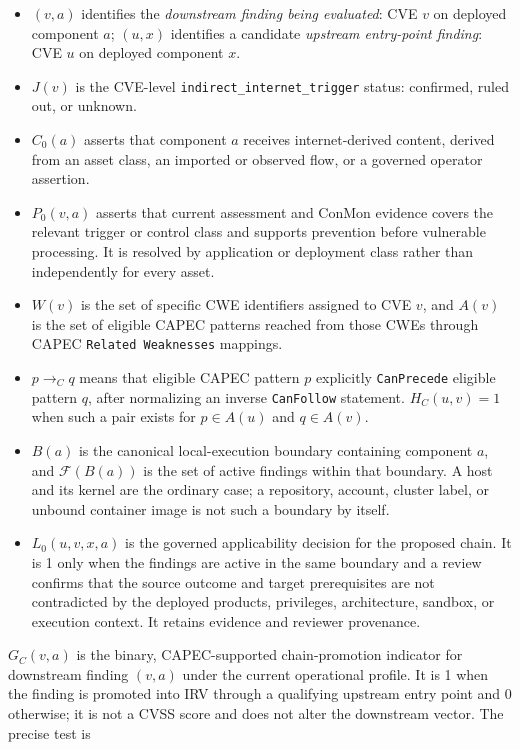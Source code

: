 \documentclass[11pt]{article}
\newcommand{\code}[1]{\texttt{#1}}
\begin{document}
\begin{itemize}[leftmargin=1.5em,nosep]
\item $(v,a)$ identifies the \emph{downstream finding being evaluated}: CVE
  $v$ on deployed component $a$; $(u,x)$ identifies a candidate \emph{upstream
  entry-point finding}: CVE $u$ on deployed component $x$.
\item $J(v)$ is the CVE-level
  \code{indirect\_}\allowbreak\code{internet\_}\allowbreak\code{trigger}
  status: confirmed, ruled out, or unknown.
\item $C_0(a)$ asserts that component $a$ receives internet-derived content,
  derived from an asset class, an imported or observed flow, or a governed
  operator assertion.
\item $P_0(v,a)$ asserts that current assessment and ConMon evidence covers the
  relevant trigger or control class and supports prevention before vulnerable
  processing. It is resolved by application or deployment class rather than
  independently for every asset.
\item $W(v)$ is the set of specific CWE identifiers assigned to CVE $v$, and
  $A(v)$ is the set of eligible CAPEC patterns reached from those CWEs through
  CAPEC \code{Related Weaknesses} mappings.
\item $p\rightarrow_C q$ means that eligible CAPEC pattern $p$ explicitly
  \code{CanPrecede} eligible pattern $q$, after normalizing an inverse
  \code{CanFollow} statement. $H_C(u,v)=1$ when such a pair exists for
  $p\in A(u)$ and $q\in A(v)$.
\item $B(a)$ is the canonical local-execution boundary containing component
  $a$, and $\mathcal F(B(a))$ is the set of active findings within that
  boundary. A host and its kernel are the ordinary case; a repository, account,
  cluster label, or unbound container image is not such a boundary by itself.
\item $L_0(u,v,x,a)$ is the governed applicability decision for the proposed
  chain. It is 1 only when the findings are active in the same boundary and a
  review confirms that the source outcome and target prerequisites are not
  contradicted by the deployed products, privileges, architecture, sandbox, or
  execution context. It retains evidence and reviewer provenance.
\end{itemize}

$G_C(v,a)$ is the binary, CAPEC-supported chain-promotion indicator for downstream
finding $(v,a)$ under the current operational profile. It is 1 when the finding
is promoted into IRV through a qualifying upstream entry point and 0 otherwise;
it is not a CVSS score and does not alter the downstream vector. The precise
test is
\end{document}
